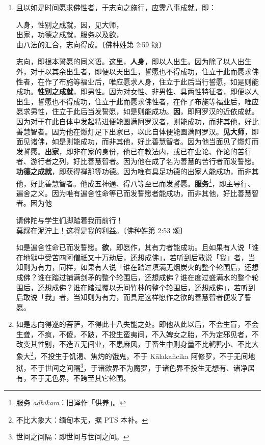 \begin{enumerate}
\item 且以如是时间愿求佛性者，于志向之施行，应需八事成就，即：\begin{quoting}人身，性别之成就，因，见大师，\\出家，功德之成就，服务以及欲，\\由八法的汇合，志向得成。{\bluefootnotesize 〔佛种姓第 2:59 颂〕}\end{quoting}志向，即根本誓愿的同义语。这里，\textbf{人身}，即以人出生。因为除了以人出生外，对于以其余出生者，即便以天出生，誓愿也不得成功，住立于此而愿求佛性者，在作了布施等福业后，唯应愿求人身，住立于此后当行誓愿，如是则能成功。\textbf{性别之成就}，即男性。因为对女性、非男性、具两性特征者，即便以人出生，誓愿也不得成功，住立于此而愿求佛性者，在作了布施等福业后，唯应愿求男性，住立于此后当发誓愿，如是则能成功。\textbf{因}，即阿罗汉的近依成就。因为对于在此自体中发起精进便能圆满阿罗汉者，则能成功，而非其他，好比善慧智者。因为他在燃灯足下出家已，以此自体便能圆满阿罗汉。\textbf{见大师}，即面见诸佛，如是则能成功，而非其他，好比善慧智者。因为他当面见了燃灯而发誓愿。\textbf{出家}，即非在家的身份，他已在教法内，或已在业论、作论的苦行者、游行者之列，好比善慧智者。因为他在成了名为善慧的苦行者而发誓愿。\textbf{功德之成就}，即获得禅那等功德。因为唯有具足功德的出家人能成功，而非其他，好比善慧智者。他成五神通、得八等至已而发誓愿。\textbf{服务}\footnote{服务 \textit{adhikāra}：旧译作「供养」。}，即主导行、遍舍之义。因为唯有遍舍性命等已而发誓愿者能成功，而非其他，好比善慧智者。因为他\begin{quoting}请佛陀与学生们脚踏着我而前行！\\莫踩在泥泞上！这将是我的利益。{\bluefootnotesize 〔佛种姓第 2:53 颂〕}\end{quoting}如是遍舍性命已而发誓愿。\textbf{欲}，即愿作，其有力者能成功。且如果有人说「谁在地狱中受苦四阿僧祇又十万劫后，还想成佛」，若听到后敢说「我」者，当知则为有力，同样，如果有人说「谁在踏过填满无烟炭火的整个轮围后，还想成佛？谁在踏过铺满剑矛的整个轮围后，还想成佛？谁在度过盛满水的整个轮围后，还想成佛？谁在踏过覆以无间竹林的整个轮围后，还想成佛」，若听到后敢说「我」者，当知则为有力，而具足这样愿作之欲的善慧智者便发了誓愿。
\item 如是志向得遂的菩萨，不得此十八失能之处。即他从此以后，不会生盲，不会生聋，不疯，不傻，不跛，不投生蛮夷间，不入婢女之胎，不为定邪见者，不改变其性别，不造五无间业，不患麻风，于畜生中则身量不比鹌鹑小、不比大象大\footnote{不比大象大：缅甸本无，据 PTS 本补。}，不投生于饥渴、焦灼的饿鬼，不于 Kālakañcika 阿修罗，不于无间地狱，不于世间之间隔\footnote{世间之间隔：即世间与世间之间。}，于诸欲界不为魔罗，于诸色界不投生无想有、诸净居有，不于无色界，不跨至其它轮围。

\end{enumerate}

